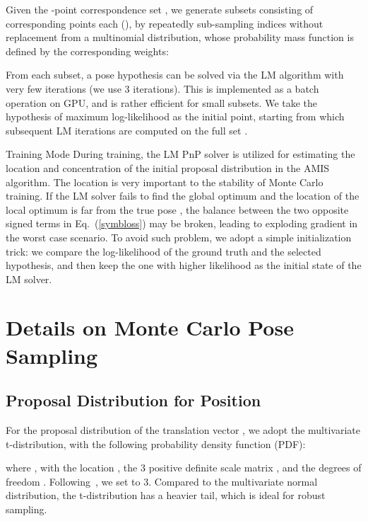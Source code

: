 \documentclass[10pt,twocolumn,letterpaper]{article}
\makeatletter
\renewcommand{\paragraph}{
  \@startsection{paragraph}{4}
  {\z@}{1.0ex \@plus 0ex \@minus .3ex}{-1em}
  {\normalfont\normalsize\bfseries}
}
\makeatother
\begin{document}
Given the -point correspondence set , we generate  subsets consisting of  corresponding points each (), by repeatedly sub-sampling  indices without replacement from a multinomial distribution, whose probability mass function  is defined by the corresponding weights:

From each subset, a pose hypothesis can be solved via the LM algorithm with very few iterations (we use 3 iterations). This is implemented as a batch operation on GPU, and is rather efficient for small subsets. We take the hypothesis of maximum log-likelihood  as the initial point, starting from which subsequent LM iterations are computed on the full set . 

\paragraph{Training Mode}
During training, the LM PnP solver is utilized for estimating the location and concentration of the initial proposal distribution in the AMIS algorithm. The location is very important to the stability of Monte Carlo training. If the LM solver fails to find the global optimum and the location of the local optimum is far from the true pose , the balance between the two opposite signed terms in Eq.~(\ref{symbloss}) may be broken, leading to exploding gradient in the worst case scenario. To avoid such problem, we adopt a simple initialization trick: we compare the log-likelihood  of the ground truth  and the selected hypothesis, and then keep the one with higher likelihood as the initial state of the LM solver. 

\section{Details on Monte Carlo Pose Sampling}

\subsection{Proposal Distribution for Position}

For the proposal distribution of the translation vector , we adopt the multivariate t-distribution, with the following probability density function (PDF):

where , with the location , the 3 positive definite scale matrix , and the degrees of freedom . Following~\cite{amis}, we set  to 3. Compared to the multivariate normal distribution, the t-distribution has a heavier tail, which is ideal for robust sampling. 
\end{document}
